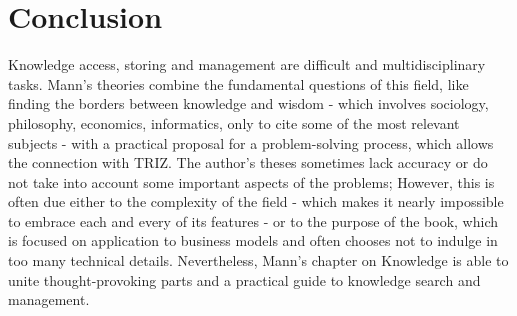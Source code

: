 \chapter{Conclusion}
Knowledge access, storing and management are difficult and multidisciplinary tasks. Mann's theories combine the fundamental questions of this field, like finding the borders between knowledge and wisdom - which involves sociology, philosophy, economics, informatics, only to cite some of the most relevant subjects - with a practical proposal for a problem-solving process, which allows the connection with TRIZ. The author's theses sometimes lack accuracy or do not take into account some important aspects of the problems; However, this is often due either to the complexity of the field - which makes it nearly impossible to embrace each and every of its features - or to the purpose of the book, which is focused on application to business models and often chooses not to indulge in too many technical details. Nevertheless, Mann's chapter on Knowledge is able to unite thought-provoking parts and a practical guide to knowledge search and management.